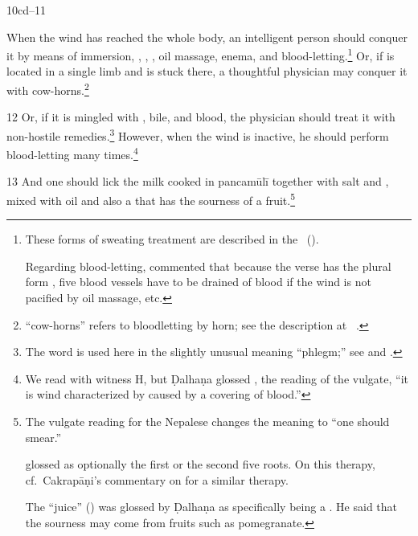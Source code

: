 \begin{translation}
    


    \item[10cd--11] 
    
When the wind has reached the whole body, an intelligent person should
conquer it by means of immersion, , , , oil massage, enema, and
blood-letting.\footnote{These forms of sweating treatment are
    described in the \CS\ ().
    
Regarding blood-letting,  commented  that because
the verse has the plural form , five blood vessels
have to be drained of blood if the wind is not pacified by oil
massage, etc.} Or, if is located in a single limb and is stuck there,
a thoughtful physician may conquer it with
cow-horns.\footnote{ “cow-horns” refers to bloodletting by
    horn; see the description at \SS\ .}
        
       
            
    \item[12] Or, if it is mingled with , bile, and
blood, the physician should treat it with non-hostile
remedies.\footnote{The word  is used here in the
    slightly unusual meaning “phlegm;” see  and \cite[553]{josi-maha}.} However, when the
    wind is inactive, he should perform blood-letting many
    times.\footnote{We read  with witness H, but
        Ḍalhaṇa glossed , the reading of the vulgate, “it is
        wind characterized by  caused by a covering
        of blood.”}

    \item[13] And one should lick the milk cooked in \gls{pancamūlī}
together with salt and ,
mixed with oil and also a  that has the sourness of
a fruit.\footnote{The vulgate reading  for the Nepalese 
 changes the meaning to “one should smear.”
    
     glossed  as optionally the first  or 
    the second five roots.  On this therapy, cf.\ Cakrapāṇi's commentary on 
     for a similar therapy.
    
    The “juice” () was glossed by Ḍalhaṇa as specifically
being a .   He said that the sourness
may come from fruits such as pomegranate.
    
}
\end{translation}

